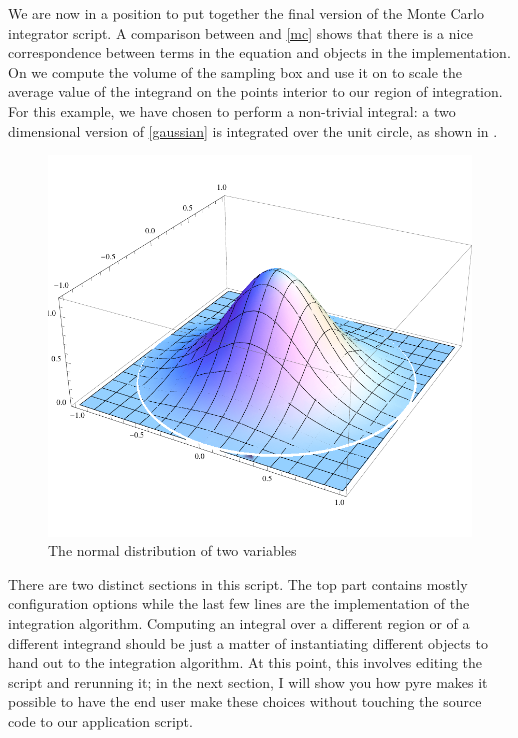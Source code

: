 We are now in a position to put together the final version of the Monte Carlo integrator
script.
%
%
A comparison between  and \eqref{mc} shows that there is a nice
correspondence between terms in the equation and objects in the implementation. On
 we compute the volume of the sampling box and use it on
 to scale the average value of the integrand on the points interior to
our region of integration. For this example, we have chosen to perform a non-trivial integral:
a two dimensional version of \eqref{gaussian} is integrated over the unit circle, as shown in
.
%
\begin{figure}
\centering
\includegraphics[scale=0.60]{figures/gaussian.pdf}
\caption{The normal distribution of two variables\label{fig:gaussian}}
\end{figure}
%
There are two distinct sections in this script. The top part contains mostly configuration
options while the last few lines are the implementation of the integration algorithm. Computing
an integral over a different region or of a different integrand should be just a matter of
instantiating different objects to hand out to the integration algorithm. At this point, this
involves editing the script and rerunning it; in the next section, I will show you how pyre
makes it possible to have the end user make these choices without touching the source code to
our application script.

